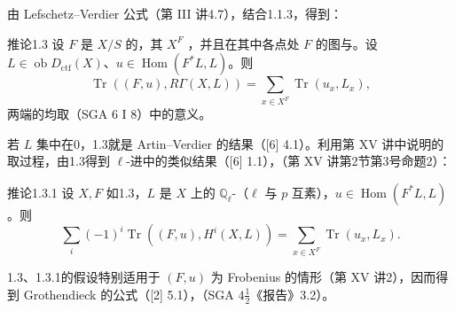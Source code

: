 由 Lefschetz--Verdier 公式（第 III 讲4.7），结合1.1.3，得到：
\begin{SGAresult}{推论}{1.3}
设 $F$ 是 $X/S$ 的，其 $X^F$ ，并且在其中各点处 $F$ 的图与。设 $L\in\operatorname{ob}D_{\mathrm{ctf}}(X)$、$u\in\operatorname{Hom}(F^*L,L)$。则
\[
 \operatorname{Tr}((F,u),R\Gamma(X,L))=
 \sum_{x\in X^F}\operatorname{Tr}(u_x,L_x),
\]
两端的均取（SGA 6 I 8）中的意义。
\end{SGAresult}
若 $L$ 集中在0，1.3就是 Artin--Verdier 的结果（[6] 4.1）。利用第 XV 讲中说明的取过程，由1.3得到 $\ell$-进中的类似结果（[6] 1.1），（第 XV 讲第2节第3号命题2）：
\begin{SGAresult}{推论}{1.3.1}
设 $X,F$ 如1.3，$L$ 是 $X$ 上的 $\mathbb Q_\ell$-（$\ell$ 与 $p$ 互素），$u\in\operatorname{Hom}(F^*L,L)$。则
\[
 \sum_i(-1)^i\operatorname{Tr}((F,u),H^i(X,L))
 =\sum_{x\in X^F}\operatorname{Tr}(u_x,L_x).
\]
\end{SGAresult}
1.3、1.3.1的假设特别适用于 $(F,u)$ 为 Frobenius 的情形（第 XV 讲2），因而得到 Grothendieck 的公式（[2] 5.1），（SGA $4\frac12$《报告》3.2）。

